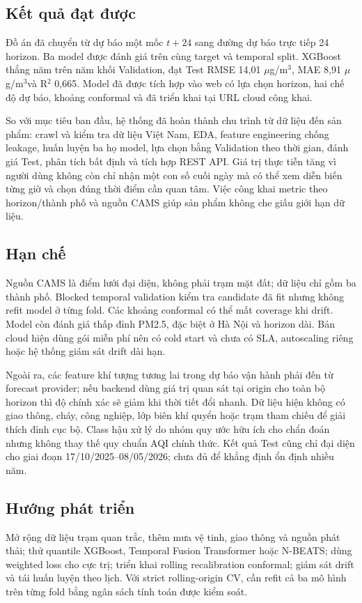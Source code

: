 \documentclass[11pt,a4paper]{article}
\newcommand{\unitpm}{$\mu$g/m$^3$}
\begin{document}
\subsection{Kết quả đạt được}
Đồ án đã chuyển từ dự báo một mốc $t+24$ sang đường dự báo trực tiếp 24 horizon. Ba model được đánh giá trên cùng target và temporal split. XGBoost thắng năm trên năm khối Validation, đạt Test RMSE 14,01 \unitpm, MAE 8,91 \unitpm và R$^2$ 0,665. Model đã được tích hợp vào web có lựa chọn horizon, hai chế độ dự báo, khoảng conformal và đã triển khai tại URL cloud công khai.

So với mục tiêu ban đầu, hệ thống đã hoàn thành chu trình từ dữ liệu đến sản phẩm: crawl và kiểm tra dữ liệu Việt Nam, EDA, feature engineering chống leakage, huấn luyện ba họ model, lựa chọn bằng Validation theo thời gian, đánh giá Test, phân tích bất định và tích hợp REST API. Giá trị thực tiễn tăng vì người dùng không còn chỉ nhận một con số cuối ngày mà có thể xem diễn biến từng giờ và chọn đúng thời điểm cần quan tâm. Việc công khai metric theo horizon/thành phố và nguồn CAMS giúp sản phẩm không che giấu giới hạn dữ liệu.

\subsection{Hạn chế}
Nguồn CAMS là điểm lưới đại diện, không phải trạm mặt đất; dữ liệu chỉ gồm ba thành phố. Blocked temporal validation kiểm tra candidate đã fit nhưng không refit model ở từng fold. Các khoảng conformal có thể mất coverage khi drift. Model còn đánh giá thấp đỉnh PM2.5, đặc biệt ở Hà Nội và horizon dài. Bản cloud hiện dùng gói miễn phí nên có cold start và chưa có SLA, autoscaling riêng hoặc hệ thống giám sát drift dài hạn.

Ngoài ra, các feature khí tượng tương lai trong dự báo vận hành phải đến từ forecast provider; nếu backend dùng giá trị quan sát tại origin cho toàn bộ horizon thì độ chính xác sẽ giảm khi thời tiết đổi nhanh. Dữ liệu hiện không có giao thông, cháy, công nghiệp, lớp biên khí quyển hoặc trạm tham chiếu để giải thích đỉnh cục bộ. Class hậu xử lý do nhóm quy ước hữu ích cho chẩn đoán nhưng không thay thế quy chuẩn AQI chính thức. Kết quả Test cũng chỉ đại diện cho giai đoạn 17/10/2025--08/05/2026; chưa đủ để khẳng định ổn định nhiều năm.

\subsection{Hướng phát triển}
Mở rộng dữ liệu trạm quan trắc, thêm mưa vệ tinh, giao thông và nguồn phát thải; thử quantile XGBoost, Temporal Fusion Transformer hoặc N-BEATS; dùng weighted loss cho cực trị; triển khai rolling recalibration conformal; giám sát drift và tái huấn luyện theo lịch. Với strict rolling-origin CV, cần refit cả ba mô hình trên từng fold bằng ngân sách tính toán được kiểm soát.
\end{document}
